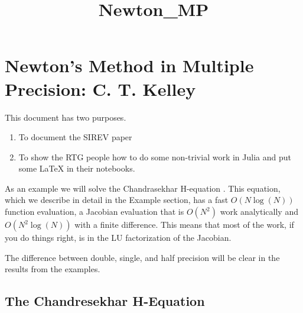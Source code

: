 \documentclass[11pt]{article}
\title{Newton\_MP}
\begin{document}
    
    
    \maketitle
    
    

    

\newcommand{\calf}{{\cal F}}
\newcommand{\dnu}{d \nu}
\newcommand{\mf}{{\bf F}}
\newcommand{\vu}{{\bf u}}
\newcommand{\ve}{{\bf e}}
\newcommand{\ml}{{\bf L}}
\newcommand{\mg}{{\bf G}}
\newcommand{\mi}{{\bf I}}
\newcommand{\diag}{\mbox{diag}}


\hypertarget{newtons-method-in-multiple-precision-c.-t.-kelley}{%
\section{Newton's Method in Multiple Precision: C. T.
Kelley}\label{newtons-method-in-multiple-precision-c.-t.-kelley}}

This document has two purposes.

\begin{enumerate}
\def\labelenumi{\arabic{enumi}.}
\item
  To document the SIREV paper \cite{ctk:sirev19}
\item
  To show the RTG people how to do some non-trivial work in Julia and
  put some LaTeX in their notebooks.
\end{enumerate}

As an example we will solve the Chandrasekhar H-equation \cite{chand}.
This equation, which we describe in detail in the Example section, has a
fast \(O(N \log(N))\) function evaluation, a Jacobian evaluation that is
\(O(N^2)\) work analytically and \(O(N^2 \log(N))\) with a finite
difference. This means that most of the work, if you do things right, is
in the LU factorization of the Jacobian.

The difference between double, single, and half precision will be clear
in the results from the examples.

    \hypertarget{the-chandresekhar-h-equation}{%
\subsection{The Chandresekhar
H-Equation}\label{the-chandresekhar-h-equation}}
\end{document}

